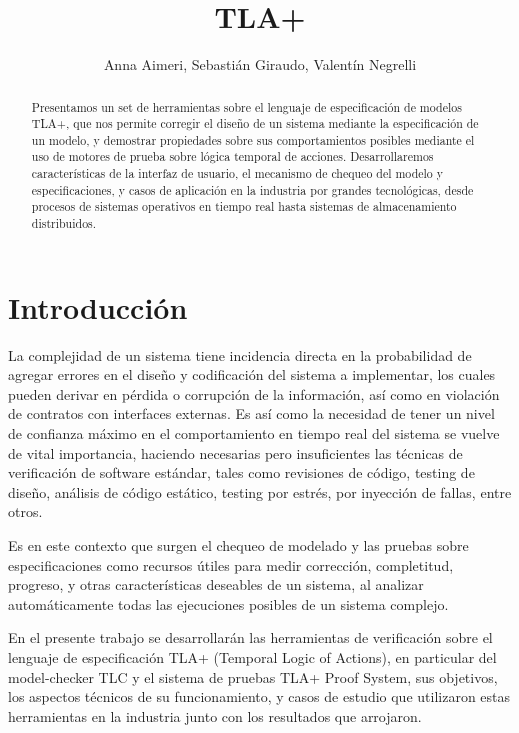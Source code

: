 \documentclass[runningheads]{llncs}
\begin{document}
\title{TLA+}
\author{Anna Aimeri, Sebastián Giraudo, Valentín Negrelli}
\maketitle              %
%
\begin{abstract}
Presentamos un set de herramientas sobre el lenguaje de especificación de modelos TLA+, que nos permite corregir el diseño de un sistema mediante la especificación de un modelo, y demostrar propiedades sobre sus comportamientos posibles mediante el uso de motores de prueba sobre lógica temporal de acciones. Desarrollaremos características de la interfaz de usuario, el mecanismo de chequeo del modelo y especificaciones,  y casos de aplicación en la industria por grandes tecnológicas, desde procesos de sistemas operativos en tiempo real hasta sistemas de almacenamiento distribuidos.
\end{abstract}

\section{Introducción}
La complejidad de un sistema tiene incidencia directa en la probabilidad de agregar errores en el diseño y codificación del sistema a implementar, los cuales pueden derivar en pérdida o corrupción de la información, así como en violación de contratos con interfaces externas. Es así como la necesidad de tener un nivel de confianza máximo en el comportamiento en tiempo real del sistema se vuelve de vital importancia, haciendo necesarias pero insuficientes las técnicas de verificación de software estándar, tales como revisiones de código, testing de diseño, análisis de código estático, testing por estrés, por inyección de fallas, entre otros. 

Es en este contexto que surgen el chequeo de modelado y las pruebas sobre especificaciones como recursos útiles para medir corrección, completitud, progreso, y otras características deseables de un sistema, al analizar automáticamente todas las ejecuciones posibles de un sistema complejo.

En el presente trabajo se desarrollarán las herramientas de verificación sobre el lenguaje de especificación TLA+ (Temporal Logic of Actions), en particular del model-checker TLC y el sistema de pruebas TLA+ Proof System, sus objetivos, los aspectos técnicos de su funcionamiento, y casos de estudio que utilizaron estas herramientas en la industria junto con los resultados que arrojaron.
\end{document}
